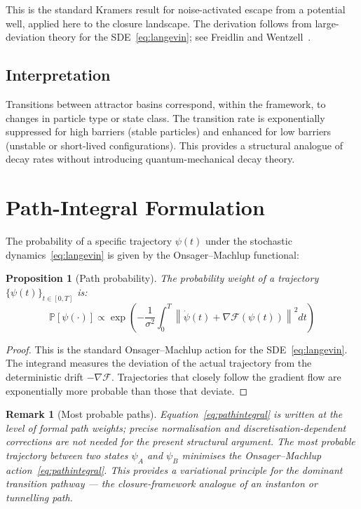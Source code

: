 \documentclass[12pt]{article}
\newtheorem{proposition}[theorem]{Proposition}
\newtheorem{remark}[theorem]{Remark}
\newcommand{\Fcal}{\mathcal{F}}
\begin{document}
This is the standard Kramers result for noise-activated escape from a potential well, applied here to the closure landscape. The derivation follows from large-deviation theory for the SDE~\eqref{eq:langevin}; see Freidlin and Wentzell~\citep{FreidlinWentzell1998}.

\subsection{Interpretation}

Transitions between attractor basins correspond, within the framework, to changes in particle type or state class. The transition rate is exponentially suppressed for high barriers (stable particles) and enhanced for low barriers (unstable or short-lived configurations). This provides a structural analogue of decay rates without introducing quantum-mechanical decay theory.

\section{Path-Integral Formulation}\label{sec:pathintegral}

The probability of a specific trajectory $\psi(t)$ under the stochastic dynamics~\eqref{eq:langevin} is given by the Onsager--Machlup functional:

\begin{proposition}[Path probability]\label{prop:path}
The probability weight of a trajectory $\{\psi(t)\}_{t \in [0,T]}$ is:
\begin{equation}\label{eq:pathintegral}
    \mathbb{P}[\psi(\cdot)] \propto \exp\!\left(-\frac{1}{\sigma^2}\int_0^T \left\|\dot{\psi}(t) + \nabla\Fcal(\psi(t))\right\|^2 dt\right)
\end{equation}
\end{proposition}

\begin{proof}
This is the standard Onsager--Machlup action for the SDE~\eqref{eq:langevin}. The integrand measures the deviation of the actual trajectory from the deterministic drift $-\nabla\Fcal$. Trajectories that closely follow the gradient flow are exponentially more probable than those that deviate.
\end{proof}

\begin{remark}[Most probable paths]
Equation~\eqref{eq:pathintegral} is written at the level of formal path weights; precise normalisation and discretisation-dependent corrections are not needed for the present structural argument. The most probable trajectory between two states $\psi_A$ and $\psi_B$ minimises the Onsager--Machlup action~\eqref{eq:pathintegral}. This provides a variational principle for the dominant transition pathway --- the closure-framework analogue of an instanton or tunnelling path.
\end{remark}
\end{document}
